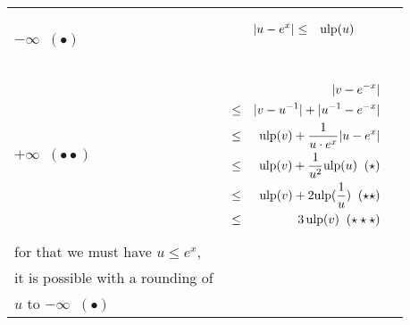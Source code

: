 \documentclass[12pt]{amsart}
\def\ulp{{\rm ulp}}
\begin{document}
\begin{center}
\begin{tabular}{l|l |l}

\begin{minipage}{2.5cm}


${\textnormal{error}}(u)$


$u \leftarrow o(e^x)$\\
$-\infty \;\; (\bullet)$

\end{minipage} &
\begin{minipage}{7.5cm}

\begin{eqnarray}\nonumber
  |u-e^x| &\leq& \ulp(u)\\\nonumber
\end{eqnarray}

\end{minipage} &
\begin{minipage}{6cm}
{\hspace{7cm}}
\end{minipage}\\\hline
\begin{minipage}{2.5cm}
${\textnormal{error}}(v)$


$v \leftarrow o({u}^{-1}) $\\
$+\infty \;\; (\bullet\bullet)$ 
\end{minipage} &
\begin{minipage}{7.5cm}



\begin{eqnarray}\nonumber
  &&|v-e^{-x}| \\\nonumber
  &       \leq&  |v - u^{-1}| +  |u^{-1}  - e^{-x}|\\\nonumber
  &       \leq& \ulp(v) + \frac{1}{u \cdot e^x} |u-e^{x}|\\\nonumber
  &       \leq& \ulp(v) + \frac{1}{u^2} \ulp(u)\;\;(\star)\\\nonumber
  &       \leq& \ulp(v) + 2 \ulp(\frac{1}{u})\;\;(\star\star)\\\nonumber
  &       \leq& 3 \, \ulp(v)\;\;(\star\star\star)
\end{eqnarray}


\end{minipage} &
\begin{minipage}{6cm}

$(\star)$

With $\frac{1}{e^x} \leq \frac{1}{u}$,\\ 
for that we must have $u \leq e^x$,\\
it is possible with a rounding of\\
$u$ to $-\infty \;\; (\bullet)$


\end{minipage}
\end{tabular}
\end{center}
\end{document}
